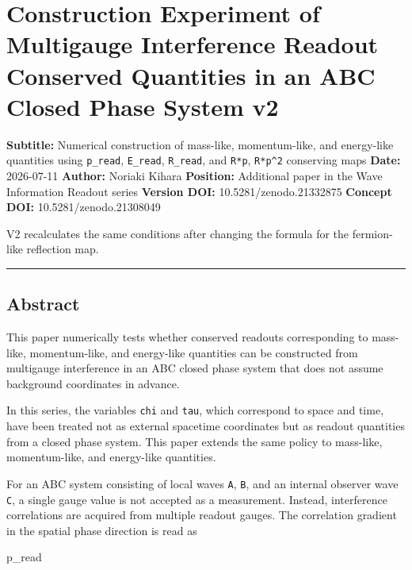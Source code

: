 \documentclass[
  a4paper,
]{article}
\author{}
\date{}
\newenvironment{Shaded}{}{}
\newcommand{\NormalTok}[1]{#1}
\begin{document}
\section{Construction Experiment of Multigauge Interference Readout
Conserved Quantities in an ABC Closed Phase System
v2}\label{construction-experiment-of-multigauge-interference-readout-conserved-quantities-in-an-abc-closed-phase-system-v2}

\textbf{Subtitle:} Numerical construction of mass-like, momentum-like,
and energy-like quantities using \texttt{p\_read}, \texttt{E\_read},
\texttt{R\_read}, and \texttt{R*p}, \texttt{R*p\^{}2} conserving maps
\textbf{Date:} 2026-07-11 \textbf{Author:} Noriaki Kihara
\textbf{Position:} Additional paper in the Wave Information Readout
series \textbf{Version DOI:} 10.5281/zenodo.21332875 \textbf{Concept
DOI:} 10.5281/zenodo.21308049

V2 recalculates the same conditions after changing the formula for the
fermion-like reflection map.

\begin{center}\rule{0.5\linewidth}{0.5pt}\end{center}

\subsection{Abstract}\label{abstract}

This paper numerically tests whether conserved readouts corresponding to
mass-like, momentum-like, and energy-like quantities can be constructed
from multigauge interference in an ABC closed phase system that does not
assume background coordinates in advance.

In this series, the variables \texttt{chi} and \texttt{tau}, which
correspond to space and time, have been treated not as external
spacetime coordinates but as readout quantities from a closed phase
system. This paper extends the same policy to mass-like, momentum-like,
and energy-like quantities.

For an ABC system consisting of local waves \texttt{A}, \texttt{B}, and
an internal observer wave \texttt{C}, a single gauge value is not
accepted as a measurement. Instead, interference correlations are
acquired from multiple readout gauges. The correlation gradient in the
spatial phase direction is read as

\begin{Shaded}
\begin{Highlighting}[]
\NormalTok{p\_read}
\end{Highlighting}
\end{Shaded}
\end{document}
